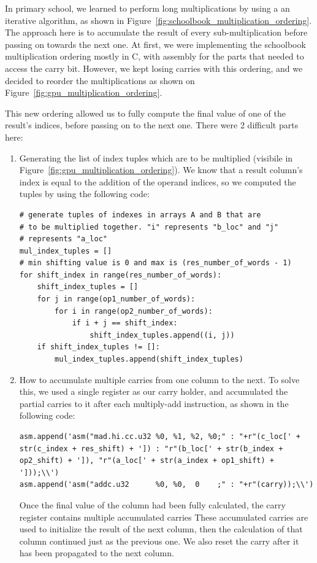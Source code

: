 \documentclass[12pt, a4paper]{report}
\begin{document}
In primary school, we learned to perform long multiplications by using a
an iterative algorithm, as shown in
Figure~\ref{fig:schoolbook_multiplication_ordering}.
The approach here is to accumulate the result of every sub-multiplication before
passing on towards the next one.
At first, we were implementing the schoolbook multiplication ordering mostly in
C, with assembly for the parts that needed to access the carry bit.
However, we kept losing carries with this ordering, and we decided to reorder the
multiplications as shown on Figure~\ref{fig:gpu_multiplication_ordering}.

This new ordering allowed us to fully compute the final value of one of the
result's indices, before passing on to the next one.
There were 2 difficult parts here:
\begin{enumerate}
\item Generating the list of index tuples which are to be multiplied (visibile in Figure~\ref{fig:gpu_multiplication_ordering}).
We know that a result column's index is equal to the addition of the operand indices, so we computed the tuples by using the following code:

\begin{lstlisting}
# generate tuples of indexes in arrays A and B that are
# to be multiplied together. "i" represents "b_loc" and "j"
# represents "a_loc"
mul_index_tuples = []
# min shifting value is 0 and max is (res_number_of_words - 1)
for shift_index in range(res_number_of_words):
    shift_index_tuples = []
    for j in range(op1_number_of_words):
        for i in range(op2_number_of_words):
            if i + j == shift_index:
                shift_index_tuples.append((i, j))
    if shift_index_tuples != []:
        mul_index_tuples.append(shift_index_tuples)
\end{lstlisting}

\item How to accumulate multiple carries from one column to
the next.
To solve this, we used a single register as our carry holder, and accumulated
the partial carries to it after each multiply-add instruction, as shown in the
following code:

\begin{lstlisting}
asm.append('asm("mad.hi.cc.u32 %0, %1, %2, %0;" : "+r"(c_loc[' + str(c_index + res_shift) + ']) : "r"(b_loc[' + str(b_index + op2_shift) + ']), "r"(a_loc[' + str(a_index + op1_shift) + ']));\\')
asm.append('asm("addc.u32      %0, %0,  0    ;" : "+r"(carry));\\')
\end{lstlisting}
Once the final value of the column had been fully calculated, the carry register contains
multiple accumulated carries
These accumulated carries are used to initialize the result of the next column,
then the calculation of that column continued just as the previous one.
We also reset the carry after it has been propagated to the next column.


\end{enumerate}
\end{document}
